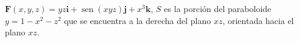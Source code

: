 \item $\mathbf{F}(x, y, z) = yz \mathbf{i} + \operatorname{sen}(xyz) \mathbf{j} + x^3 \mathbf{k}$, $S$ es la porción del paraboloide $y = 1 - x^2 - z^2$ que se encuentra a la derecha del plano $xz$, orientada hacia el plano $xz$.
